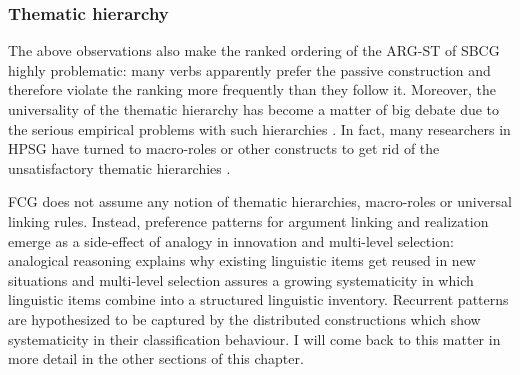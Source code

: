 \subsubsection{Thematic hierarchy}
The above observations also make the ranked ordering of the ARG-ST of SBCG highly problematic: many verbs apparently prefer the passive construction and therefore violate the ranking more frequently than they follow it. Moreover, the universality of the thematic hierarchy has become a matter of big debate due to the serious empirical problems with such hierarchies \citep{levin05argument}. In fact, many researchers in HPSG have turned to macro-roles or other constructs to get rid of the unsatisfactory thematic hierarchies \citep{davis00linking}.

FCG does not assume any notion of thematic hierarchies, macro-roles or universal linking rules. Instead, preference patterns for argument linking and realization emerge as a side-effect of analogy in innovation and multi-level selection: analogical reasoning explains why existing linguistic items get reused in new situations and multi-level selection assures a growing systematicity in which linguistic items combine into a structured linguistic inventory. Recurrent patterns are hypothesized to be captured by the distributed constructions which show systematicity in their classification behaviour. I will come back to this matter in more detail in the other sections of this chapter.


